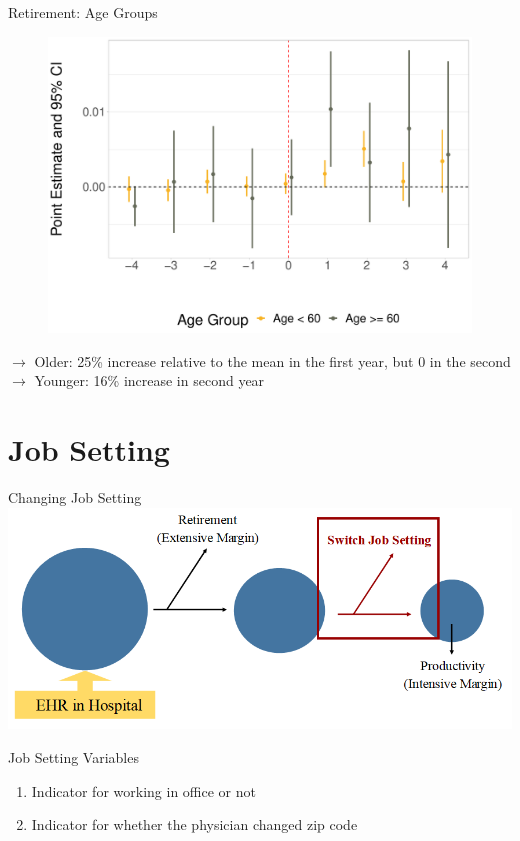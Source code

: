 \documentclass[10pt]{beamer}
\begin{document}
\begin{frame}{Retirement: Age Groups}
\begin{figure}[ht]
\centering
\includegraphics[scale=.35]{Objects/Presentation_retire_ages.pdf}
\end{figure}
$\rightarrow$ Older: 25\% increase relative to the mean in the first year, but 0 in the second\\
$\rightarrow$ Younger: 16\% increase in second year
\end{frame}



\section{Job Setting}




\begin{frame}{Changing Job Setting}
\centering
\includegraphics[scale=.5]{Objects/EHR_FlowChart_JobSwitch.PNG}
\end{frame}

\begin{frame}{Job Setting Variables}
\begin{enumerate}
    \item Indicator for working in office or not
                    \vspace{3mm}
    \item Indicator for whether the physician changed zip code
\end{enumerate}
\end{frame}
\end{document}
